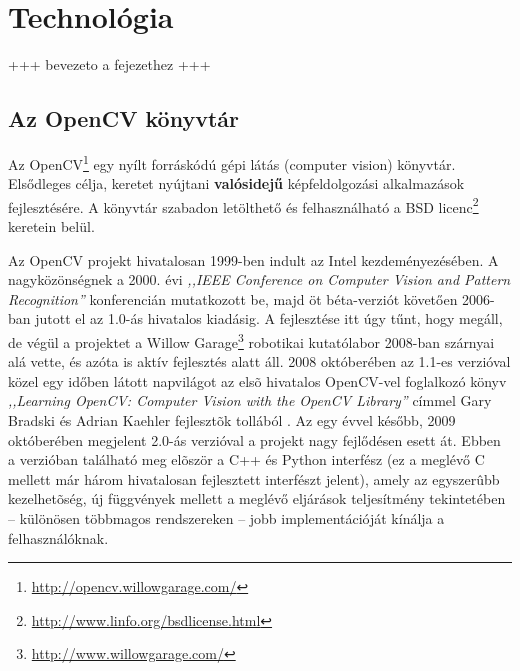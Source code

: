 \chapter{Technológia}\label{sect:technológia}

+++ bevezeto a fejezethez +++

\section{Az OpenCV könyvtár}\label{sect:opencv}

Az OpenCV\footnote{\url{http://opencv.willowgarage.com/}} egy nyílt forráskódú gépi látás (computer vision) könyvtár. Elsődleges célja, keretet nyújtani \textbf{valósidejű} képfeldolgozási alkalmazások fejlesztésére. A könyvtár szabadon letölthető és felhasználható a BSD licenc\footnote{\url{http://www.linfo.org/bsdlicense.html}} keretein belül.

\bigskip

Az OpenCV projekt hivatalosan 1999-ben indult az Intel kezdeményezésében. A nagyközönségnek a 2000. évi \textit{,,IEEE Conference on Computer Vision and Pattern Recognition''} konferencián mutatkozott be, majd öt béta-verziót követően 2006-ban jutott el az 1.0-ás hivatalos kiadásig. A fejlesztése itt úgy tűnt, hogy megáll, de végül a projektet a Willow Garage\footnote{\url{http://www.willowgarage.com/}} robotikai kutatólabor 2008-ban szárnyai alá vette, és azóta is aktív fejlesztés alatt áll. 2008 októberében az 1.1-es verzióval közel egy időben látott napvilágot az elsõ hivatalos OpenCV-vel foglalkozó könyv \textit{,,Learning OpenCV: Computer Vision with the OpenCV Library''} címmel Gary Bradski és Adrian Kaehler fejlesztõk tollából \cite{opencv_book}. Az egy évvel később, 2009 októberében megjelent 2.0-ás verzióval a projekt nagy fejlődésen esett át. Ebben a verzióban található meg elõször a C++ és Python interfész (ez a meglévő C mellett már három hivatalosan fejlesztett interfészt jelent), amely az egyszerûbb kezelhetõség, új függvények mellett a meglévő eljárások teljesítmény tekintetében -- különösen többmagos rendszereken -- jobb implementációját kínálja a felhasználóknak.

\bigskip

